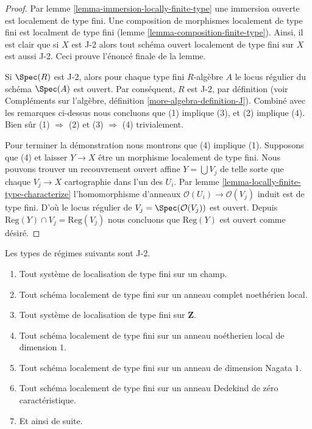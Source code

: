 \begin{proof}
Par lemme \ref{lemma-immersion-locally-finite-type} une immersion ouverte est localement de type fini. Une composition de morphismes localement de type fini est localment de type fini (lemme \ref{lemma-composition-finite-type}). Ainsi, il est clair que si $X$ est J-2 alors tout schéma ouvert localement de type fini sur $X$ est aussi J-2. Ceci prouve l'énoncé finale de la lemme.

\medskip\noindent
Si $\Spec(R)$ est J-2, alors pour chaque type fini $R$-algèbre $A$ le locus régulier du schéma $\Spec(A)$ est ouvert. Par conséquent, $R$ est J-2, par définition (voir Compléments sur l'algèbre, définition \ref{more-algebra-definition-J}). Combiné avec les remarques ci-dessus nous concluons que (1) implique (3), et (2) implique (4). Bien sûr (1) $\Rightarrow$ (2) et (3) $\Rightarrow$ (4) trivialement.

\medskip\noindent
Pour terminer la démonstration nous montrons que (4) implique (1). Supposons que (4) et laisser $Y \to X$ être un morphisme localement de type fini. Nous pouvons trouver un recouvrement ouvert affine $Y = \bigcup V_j$ de telle sorte que chaque $V_j \to X$ cartographie dans l'un des $U_i$. Par lemme \ref{lemma-locally-finite-type-characterize} l'homomorphisme d'anneaux $\mathcal{O}(U_i) \to \mathcal{O}(V_j)$ induit est de type fini. D'où le locus régulier de $V_j = \Spec(\mathcal{O}(V_j))$ est ouvert. Depuis $\text{Reg}(Y) \cap V_j = \text{Reg}(V_j)$ nous concluons que $\text{Reg}(Y)$ est ouvert comme désiré.
\end{proof}

\begin{lemma}

\label{lemma-ubiquity-J-2}

Les types de régimes suivants sont J-2.

\begin{enumerate}

\item Tout système de localisation de type fini sur un champ.
\item Tout schéma localement de type fini sur un anneau complet noethérien local.
\item Tout système de localisation de type fini sur $\mathbf{Z}$.
\item Tout schéma localement de type fini sur un anneau noétherien local de dimension $1$.
\item Tout schéma localement de type fini sur un anneau de dimension Nagata $1$.
\item Tout schéma localement de type fini sur un anneau Dedekind de zéro caractéristique.
\item Et ainsi de suite.

\end{enumerate}

\end{lemma}


